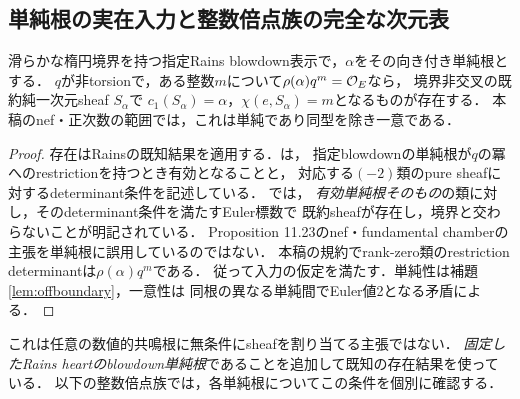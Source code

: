 \subsection{単純根の実在入力と整数倍点族の完全な次元表}
\begin{lemma}[Rainsの単純根存在結果の適用]\label{lem:Rains-simple-existence}
滑らかな楕円境界を持つ指定Rains blowdown表示で，$\alpha$をその向き付き単純根とする．
$q$が非torsionで，ある整数$m$について$\rho(\alpha)q^m=\mathcal O_E$なら，
境界非交叉の既約純一次元sheaf $S_\alpha$で
$c_1(S_\alpha)=\alpha$，$\chi(e,S_\alpha)=m$となるものが存在する．
本稿のnef・正次数の範囲では，これは単純であり同型を除き一意である．
\end{lemma}
\begin{proof}
存在はRainsの既知結果を適用する．\cite[\S4, pp.~34--35]{Filtered}は，
指定blowdownの単純根が$q$の冪へのrestrictionを持つとき有効となることと，
対応する$(-2)$類のpure sheafに対するdeterminant条件を記述している．
\cite[\S11, p.~141, Proposition 11.23の直前]{Rains}では，
\emph{有効単純根そのもの}の類に対し，そのdeterminant条件を満たすEuler標数で
既約sheafが存在し，境界と交わらないことが明記されている．
Proposition 11.23のnef・fundamental chamberの主張を単純根に誤用しているのではない．
本稿の規約でrank-zero類のrestriction determinantは$\rho(\alpha)q^m$である．
従って入力の仮定を満たす．単純性は補題\ref{lem:offboundary}，一意性は
同根の異なる単純間でEuler値2となる矛盾による．
\end{proof}
\begin{remark}
これは任意の数値的共鳴根に無条件にsheafを割り当てる主張ではない．
\emph{固定したRains heartのblowdown単純根}であることを追加して既知の存在結果を使っている．
以下の整数倍点族では，各単純根についてこの条件を個別に確認する．
\end{remark}


